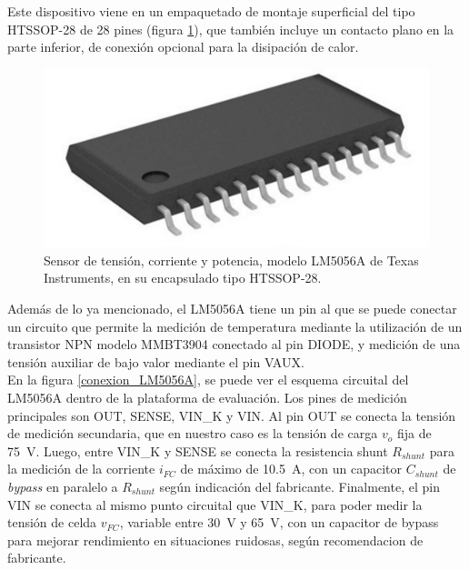 Este dispositivo viene en un empaquetado de montaje superficial del tipo HTSSOP-28 de 28 pines (figura \ref{encapsulado_LM5056}), que también incluye un contacto plano en la parte inferior, de conexión opcional para la disipación de calor.\\

\begin{figure}[h]
    \centering
    \includegraphics[scale=0.15]{Imagenes/HTSSOP.jpg}
    \caption{Sensor de tensión, corriente y potencia, modelo LM5056A de Texas Instruments, en su encapsulado tipo HTSSOP-28.}
    \label{encapsulado_LM5056}
\end{figure}

Además de lo ya mencionado, el LM5056A tiene un pin al que se puede conectar un circuito que permite la medición de temperatura mediante la utilización de un transistor NPN modelo MMBT3904 conectado al pin DIODE, y medición de una tensión auxiliar de bajo valor mediante el pin VAUX.\\

En la figura \ref{conexion_LM5056A}, se puede ver el esquema circuital del LM5056A dentro de la plataforma de evaluación. Los pines de medición principales son OUT, SENSE, VIN\_K y VIN. Al pin OUT se conecta la tensión de medición secundaria, que en nuestro caso es la tensión de carga $v_o$ fija de \SI[]{75}[]{\volt}. Luego, entre VIN\_K y SENSE se conecta la resistencia shunt $R_{shunt}$ para la medición de la corriente $i_{FC}$ de máximo de \SI[]{10.5}[]{\ampere}, con un capacitor $C_{shunt}$ de \textit{bypass} en paralelo a $R_{shunt}$ según indicación del fabricante. Finalmente, el pin VIN se conecta al mismo punto circuital que VIN\_K, para poder medir la tensión de celda $v_{FC}$, variable entre \SI[]{30}[]{\volt} y \SI[]{65}[]{\volt}, con un capacitor de bypass para mejorar rendimiento en situaciones ruidosas, según recomendacion de fabricante.\\

